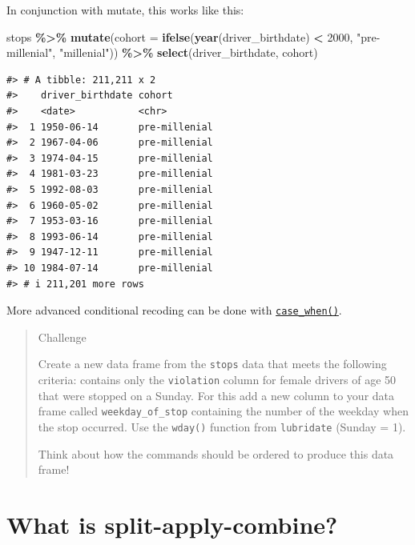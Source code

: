 \documentclass[
]{book}
\newenvironment{Shaded}{\begin{snugshade}}{\end{snugshade}}
\newcommand{\AttributeTok}[1]{\textcolor[rgb]{0.13,0.29,0.53}{#1}}
\newcommand{\DecValTok}[1]{\textcolor[rgb]{0.00,0.00,0.81}{#1}}
\newcommand{\FunctionTok}[1]{\textcolor[rgb]{0.13,0.29,0.53}{\textbf{#1}}}
\newcommand{\NormalTok}[1]{#1}
\newcommand{\SpecialCharTok}[1]{\textcolor[rgb]{0.81,0.36,0.00}{\textbf{#1}}}
\newcommand{\StringTok}[1]{\textcolor[rgb]{0.31,0.60,0.02}{#1}}
\begin{document}
In conjunction with mutate, this works like this:

\begin{Shaded}
\begin{Highlighting}[]
\NormalTok{stops }\SpecialCharTok{\%\textgreater{}\%} 
  \FunctionTok{mutate}\NormalTok{(}\AttributeTok{cohort =} \FunctionTok{ifelse}\NormalTok{(}\FunctionTok{year}\NormalTok{(driver\_birthdate) }\SpecialCharTok{\textless{}} \DecValTok{2000}\NormalTok{, }\StringTok{"pre{-}millenial"}\NormalTok{, }\StringTok{"millenial"}\NormalTok{)) }\SpecialCharTok{\%\textgreater{}\%} 
  \FunctionTok{select}\NormalTok{(driver\_birthdate, cohort)}
\end{Highlighting}
\end{Shaded}

\begin{verbatim}
#> # A tibble: 211,211 x 2
#>    driver_birthdate cohort       
#>    <date>           <chr>        
#>  1 1950-06-14       pre-millenial
#>  2 1967-04-06       pre-millenial
#>  3 1974-04-15       pre-millenial
#>  4 1981-03-23       pre-millenial
#>  5 1992-08-03       pre-millenial
#>  6 1960-05-02       pre-millenial
#>  7 1953-03-16       pre-millenial
#>  8 1993-06-14       pre-millenial
#>  9 1947-12-11       pre-millenial
#> 10 1984-07-14       pre-millenial
#> # i 211,201 more rows
\end{verbatim}

More advanced conditional recoding can be done with \href{https://dplyr.tidyverse.org/reference/case_when.html}{\texttt{case\_when()}}.

\begin{quote}
Challenge

Create a new data frame from the \texttt{stops} data that meets the following
criteria: contains only the \texttt{violation} column for female drivers of age 50 that were stopped on a Sunday. For this add a new column to your data frame called
\texttt{weekday\_of\_stop} containing the number of the weekday when the stop occurred. Use the \texttt{wday()} function from \texttt{lubridate} (Sunday = 1).

Think about how the commands should be ordered to produce this data frame!
\end{quote}

\hypertarget{what-is-split-apply-combine}{%
\section{What is split-apply-combine?}\label{what-is-split-apply-combine}}
\end{document}
